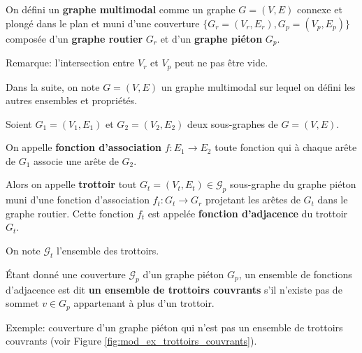 \begin{definition}
    On défini un \textbf{graphe multimodal} comme un graphe $G = (V,E)$ connexe et plongé dans le plan et muni d'une couverture $\{G_r=(V_r, E_r), G_p = (V_p, E_p)\}$ composée d'un \textbf{graphe routier} $G_r$ et d'un \textbf{graphe piéton} $G_p$.

    Remarque: l'intersection entre $V_r$ et $V_p$ peut ne pas être vide.

    Dans la suite, on note $G = (V,E)$ un graphe multimodal sur lequel on défini les autres ensembles et propriétés.
\end{definition}

\begin{definition}
    Soient $G_1=(V_1, E_1)$ et $G_2=(V_2, E_2)$ deux sous-graphes de $G=(V, E)$.
    
    On appelle \textbf{fonction d'association} $f: E_1 \rightarrow E_2$ toute fonction qui à chaque arête de $G_1$ associe une arête de $G_2$.
\end{definition}

\begin{definition}
    Alors on appelle \textbf{trottoir} tout $G_t = (V_t, E_t)\in \mathcal{G}_p$ sous-graphe du graphe piéton muni d'une fonction d'association $f_t: G_t \rightarrow G_r$ projetant les arêtes de $G_t$ dans le graphe routier. Cette fonction $f_t$ est appelée \textbf{fonction d'adjacence} du trottoir $G_t$.

    On note $\mathcal{G}_t$ l'ensemble des trottoirs.
\end{definition}

\begin{definition}
    Étant donné une couverture $\mathcal{G}_p$ d'un graphe piéton $G_p$, un ensemble de fonctions d'adjacence est dit \textbf{un ensemble de trottoirs couvrants} s'il n'existe pas de sommet $v \in G_p$ appartenant à plus d'un trottoir.

    Exemple: couverture d'un graphe piéton qui n'est pas un ensemble de trottoirs couvrants (voir Figure \ref{fig:mod_ex_trottoirs_couvrants}).
\end{definition}

